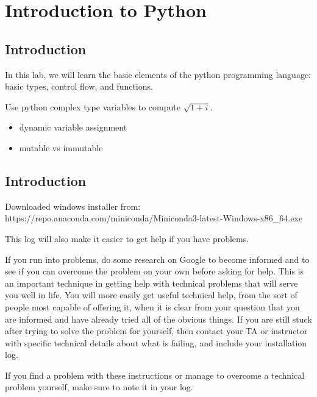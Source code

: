 \chapter{Introduction to Python}

\section{Introduction}

In this lab, we will learn the basic elements of the python
programming language: basic types, control flow, and functions.



\begin{plot}
\end{plot}
Use python complex type variables to compute $\sqrt{1+i}$.



\begin{itemize}
 \item dynamic variable assignment
 \item mutable vs immutable
\end{itemize}  




\section{Introduction}






Downloaded windows installer from:
  https://repo.anaconda.com/miniconda/Miniconda3-latest-Windows-x86\_64.exe

This log will also make it easier to get help if you have problems.

If you run into problems, do some research on Google to become
informed and to see if you can overcome the problem on your own
before asking for help.  This is an important technique in getting
help with technical problems that will serve you well in life.  You
will more easily get useful technical help, from the sort of people
most capable of offering it, when it is clear from your question that
you are informed and have already tried all of the obvious things.  If
you are still stuck after trying to solve the problem for yourself,
then contact your TA or instructor with specific technical details
about what is failing, and include your installation log.

If you find a problem with these instructions or manage to overcome a
technical problem yourself, make sure to note it in your log.

